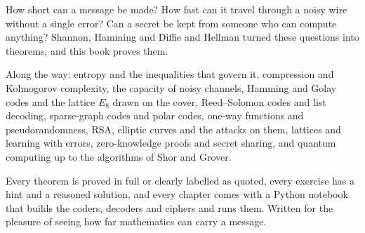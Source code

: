 How short can a message be made? How fast can it travel through a noisy wire without a single error? Can a secret be
kept from someone who can compute anything? Shannon, Hamming and Diffie and Hellman turned these questions into
theorems, and this book proves them.

Along the way: entropy and the inequalities that govern it, compression and Kolmogorov complexity, the capacity of
noisy channels, Hamming and Golay codes and the lattice $E_8$ drawn on the cover, Reed--Solomon codes and list
decoding, sparse-graph codes and polar codes, one-way functions and pseudorandomness, RSA, elliptic curves and the
attacks on them, lattices and learning with errors, zero-knowledge proofs and secret sharing, and quantum computing
up to the algorithms of Shor and Grover.

Every theorem is proved in full or clearly labelled as quoted, every exercise has a hint and a reasoned solution, and
every chapter comes with a Python notebook that builds the coders, decoders and ciphers and runs them. Written for the
pleasure of seeing how far mathematics can carry a message.
